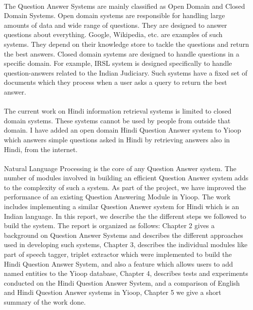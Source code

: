 \paragraph{}
The Question Answer Systems are mainly classified as Open Domain and Closed Domain Systems. 
Open domain systems are responsible for handling large amounts of data and wide range of questions. They are designed to answer questions about everything. Google, Wikipedia, etc. are examples of such systems. They depend on their knowledge store to tackle the questions and return the best answers.
Closed domain systems are designed to handle questions in a specific domain. For example, IRSL system is designed specifically to handle question-answers related to the Indian Judiciary. Such systems have a fixed set of documents which they process when a user asks a query to return the best answer.

\paragraph{}
The current work on Hindi information retrieval systems is limited to closed domain systems. These systems cannot be used by people from outside that domain. I have added an open domain Hindi Question Answer system to Yioop which answers simple questions asked in Hindi by retrieving answers also in Hindi, from the internet. 

\paragraph{}
Natural Language Processing is the core of any Question Answer system. The number of modules involved in building an efficient Question Answer system adds to the complexity of such a system. As part of the project, we have improved the performance of an existing Question Answering Module \cite {patel2015question} in Yioop. The work includes implementing a similar Question Answer system for Hindi which is an Indian language. In this report, we describe the the different steps we followed to build the system. The report is organized as follows: Chapter 2 gives a background on Question Answer Systems and describes the different approaches used in developing such systems, Chapter 3, describes the individual modules  like part of speech tagger, triplet extractor which were implemented to build the Hindi Question Answer System, and also a feature which allows users to add named entities to the Yioop database, Chapter 4, describes tests and experiments conducted on the Hindi Question Answer System, and a comparison of English and Hindi Question Answer systems in Yioop, Chapter 5 we give a short summary of the work done.

